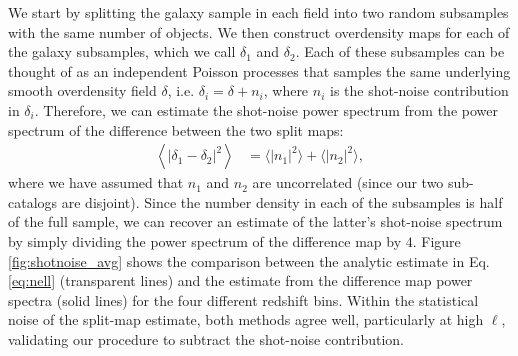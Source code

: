 \documentclass[a4paper,11pt]{article}
\begin{document}
      We start by splitting the galaxy sample in each field into two random subsamples with the same number of objects.  We then construct overdensity maps for each of the galaxy subsamples, which we call $\delta_1$ and $\delta_2$.  Each of these subsamples can be thought of as an independent Poisson processes that samples the same underlying smooth overdensity field $\delta$, i.e. $\delta_i = \delta + n_i$, where $n_i$ is the shot-noise contribution in $\delta_i$. Therefore, we can estimate the shot-noise power spectrum from the power spectrum of the difference between the two split maps:
      \begin{align}
      \left\langle |\delta_1 - \delta_2|^2 \right\rangle & = \langle|n_1|^2\rangle + \langle|n_2|^2\rangle,
      \end{align}
      where we have assumed that $n_1$ and $n_2$ are uncorrelated (since our two sub-catalogs are disjoint). Since the number density in each of the subsamples is half of the full sample, we can recover an estimate of the latter's shot-noise spectrum by simply dividing the power spectrum of the difference map by $4$. Figure \ref{fig:shotnoise_avg} shows the comparison between the analytic estimate in Eq. \ref{eq:nell} (transparent lines) and the estimate from the difference map power spectra (solid lines) for the four different redshift bins. Within the statistical noise of the split-map estimate, both methods agree well, particularly at high $\ell$, validating our procedure to subtract the shot-noise contribution.
      
    
\end{document}
